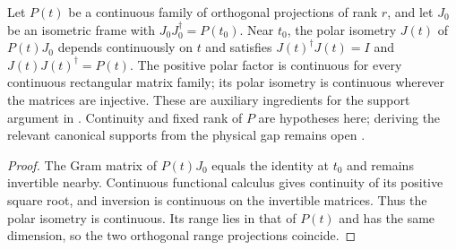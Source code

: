 \begin{lemma}
    \label{thm:spt_continuous_projection_frame}
    \leanok
    Let $P(t)$ be a continuous family of orthogonal projections of rank $r$,
    and let $J_0$ be an isometric frame with $J_0J_0^\dagger=P(t_0)$.
    Near $t_0$, the polar isometry $J(t)$ of $P(t)J_0$ depends continuously
    on $t$ and satisfies $J(t)^\dagger J(t)=I$ and
    $J(t)J(t)^\dagger=P(t)$. The positive polar factor is continuous for
    every continuous rectangular matrix family; its polar isometry is
    continuous wherever the matrices are injective.
    These are auxiliary ingredients for the support argument in
    \cite[Appendix~C]{Schuch2011Phases}. Continuity and fixed rank of $P$
    are hypotheses here; deriving the relevant canonical supports from
    the physical gap remains open
    \cite{gap:spc11_spt_interpolation_upper_range}.
\end{lemma}

\begin{proof}\leanok
    The Gram matrix of $P(t)J_0$ equals the identity at $t_0$ and remains
    invertible nearby. Continuous functional calculus gives continuity
    of its positive square root, and inversion is continuous on the
    invertible matrices. Thus the polar isometry is continuous.
    Its range lies in that of $P(t)$ and has the same dimension, so the
    two orthogonal range projections coincide.
\end{proof}

